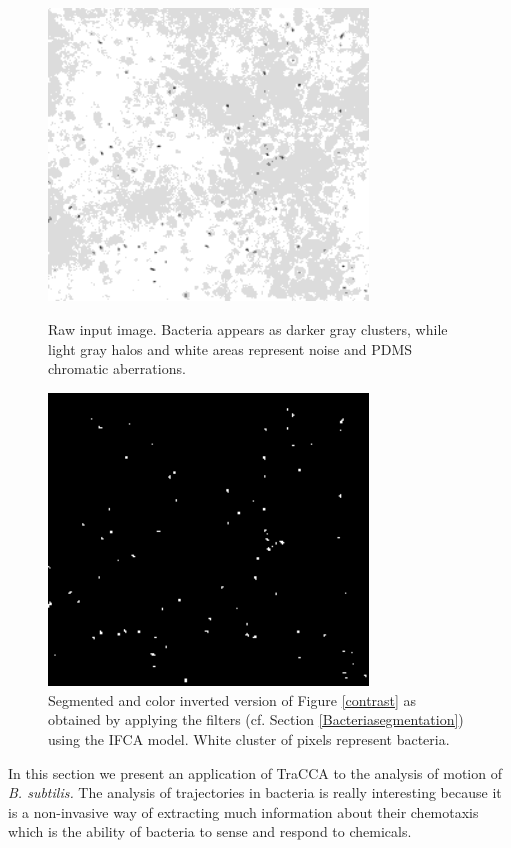 \documentclass[conference]{IEEEtran}
\begin{document}
\begin{figure}
    \begin{minipage}[l]{1.0\columnwidth}
        \centering
        \includegraphics[width=8.5cm]{./images/bacteriasmall}
        \caption{Raw input image. Bacteria appears as darker gray clusters, while light gray halos and white areas represent noise and PDMS chromatic aberrations.}\label{contrast}
    \end{minipage}
    \hfill{}
    \begin{minipage}[r]{1.0\columnwidth}
        \centering
        \includegraphics[width=8.5cm]{./images/bacteriasmall_threshold}
        \caption{Segmented and color inverted version of Figure \ref{contrast} as obtained by applying the filters (cf. Section \ref{Bacteriasegmentation}) using the IFCA model. White cluster of pixels represent bacteria.}\label{BBB}
    \end{minipage}
\end{figure}
In this section we present an application of TraCCA to the analysis of motion of \textit{B. subtilis.}
The analysis of trajectories in bacteria is really interesting because it is a non-invasive way of extracting much information about their chemotaxis which is the ability of bacteria to sense and respond to chemicals.
\end{document}
